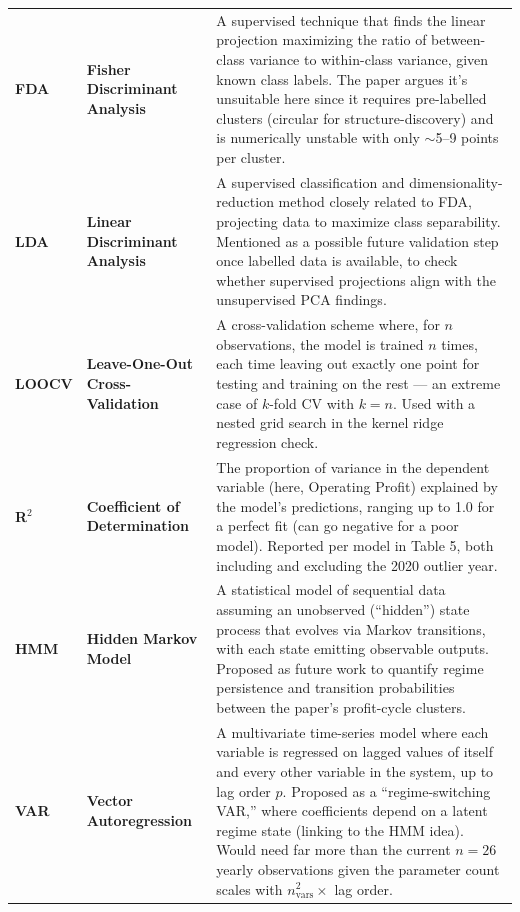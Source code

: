 \documentclass[11pt]{article}
\newcommand{\glossaryhighlight}[1]{\textbf{\boldmath#1}}
\begin{document}
\begin{longtable}{P{2cm} P{3cm} P{11cm}}
\glossaryhighlight{FDA} & \glossaryhighlight{Fisher Discriminant Analysis} &
A supervised technique that finds the linear projection maximizing the ratio of between-class variance to within-class variance, given known class labels. The paper argues it's unsuitable here since it requires pre-labelled clusters (circular for structure-discovery) and is numerically unstable with only $\sim$5--9 points per cluster. \\

\glossaryhighlight{LDA} & \glossaryhighlight{Linear Discriminant Analysis} &
A supervised classification and dimensionality-reduction method closely related to FDA, projecting data to maximize class separability. Mentioned as a possible future validation step once labelled data is available, to check whether supervised projections align with the unsupervised PCA findings. \\

\glossaryhighlight{LOOCV} & \glossaryhighlight{Leave-One-Out Cross-Validation} &
A cross-validation scheme where, for $n$ observations, the model is trained $n$ times, each time leaving out exactly one point for testing and training on the rest --- an extreme case of $k$-fold CV with $k=n$. Used with a nested grid search in the kernel ridge regression check. \\

\glossaryhighlight{R$^2$} & \glossaryhighlight{Coefficient of Determination} &
The proportion of variance in the dependent variable (here, Operating Profit) explained by the model's predictions, ranging up to 1.0 for a perfect fit (can go negative for a poor model). Reported per model in Table 5, both including and excluding the 2020 outlier year. \\

\glossaryhighlight{HMM} & \glossaryhighlight{Hidden Markov Model} &
A statistical model of sequential data assuming an unobserved (``hidden'') state process that evolves via Markov transitions, with each state emitting observable outputs. Proposed as future work to quantify regime persistence and transition probabilities between the paper's profit-cycle clusters. \\

\glossaryhighlight{VAR} & \glossaryhighlight{Vector Autoregression} &
A multivariate time-series model where each variable is regressed on lagged values of itself and every other variable in the system, up to lag order $p$. Proposed as a ``regime-switching VAR,'' where coefficients depend on a latent regime state (linking to the HMM idea). Would need far more than the current $n=26$ yearly observations given the parameter count scales with $n_{\text{vars}}^2 \times$ lag order. \\


\end{longtable}
\end{document}

